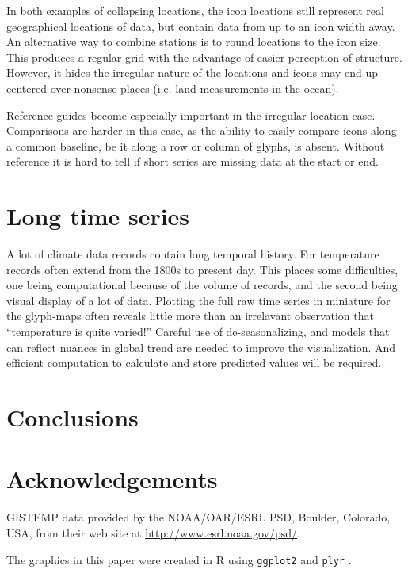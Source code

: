 \documentclass[oneside]{article}
\begin{document}
In both examples of collapsing locations, the icon locations still represent real geographical locations of data, but contain data from up to an icon width away.  An alternative way to combine stations is to round locations to the icon size.  This produces a regular grid with the advantage of easier perception of structure.  However, it hides the irregular nature of the locations and icons may end up centered over nonsense places (i.e. land measurements in the ocean).

Reference guides become especially important in the irregular location case. Comparisons are harder in this case, as the ability to easily compare icons along a common baseline, be it along a row or column of glyphs, is absent. Without reference it is hard to tell if short series are missing data at the start or end.  

\section{Long time series}

A lot of climate data records contain long temporal history. For temperature records often extend from the 1800s to present day. This places some difficulties, one being computational because of the volume of records, and the second being visual display of a lot of data. Plotting the full raw time series in miniature for the glyph-maps often reveals little more than an irrelavant observation that ``temperature is quite varied!'' Careful use of de-seasonalizing, and models that can reflect nuances in global trend are needed to improve the visualization. And efficient computation to calculate and store predicted values will be required.

\section{Conclusions}

\section*{Acknowledgements}

GISTEMP data provided by the NOAA/OAR/ESRL PSD, Boulder, Colorado,
USA, from their web site at \url{http://www.esrl.noaa.gov/psd/}.

The graphics in this paper were created in R \citep{R} using {\tt ggplot2} \citep{me:ggplot2} and {\tt plyr} \citep{me:plyr}. 


\end{document}
